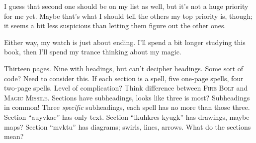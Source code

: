 I guess that second one should be on my list as well, but it's not a huge priority for me yet. Maybe that's what I should tell the others my top priority is, though; it seems a bit less suspicious than letting them figure out the other ones.

Either way, my watch is just about ending. I'll spend a bit longer studying this book, then I'll spend my trance thinking about my magic.

\pause

Thirteen pages. Nine with headings, but can't decipher headings. Some sort of code? Need to consider this. If each section is a spell, five one-page spells, four two-page spells. Level of complication? Think difference between \textsc{Fire Bolt} and \textsc{Magic Missile}. Sections have subheadings, looks like three is most? Subheadings in common! Three \emph{specific} subheadings, each spell has no more than those three. Section ``auyvkae'' has only text. Section ``lkuhkres kyugk'' has drawings, maybe maps? Section ``mvktu'' has diagrams; swirls, lines, arrows. What do the sections mean?

\sleep
